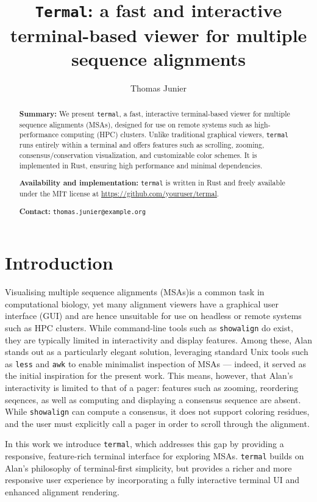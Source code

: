\documentclass[11pt]{article}
\title{%
\texttt{Termal}: a fast and interactive terminal-based viewer for multiple sequence alignments
}
\author[1]{Thomas Junier}
\affil[1]{Swiss Institute of Bioinformatics, Vital-\textsc{it} Group, Switzerland\\
\texttt{thomas.junier@sib.swiss}}
\date{} %
\begin{document}
\maketitle

\begin{abstract} \textbf{Summary:} We present \texttt{termal}, a fast,
  interactive terminal-based viewer for multiple sequence alignments (MSAs),
  designed for use on remote systems such as high-performance computing (HPC)
  clusters. Unlike traditional graphical viewers, \texttt{termal} runs entirely
  within a terminal and offers features such as scrolling, zooming,
  consensus/conservation visualization, and customizable color schemes. It is
  implemented in Rust, ensuring high performance and minimal dependencies.

  \textbf{Availability and implementation:} \texttt{termal} is written in Rust
  and freely available under the MIT license at
  \url{https://github.com/youruser/termal}.

\textbf{Contact:} \texttt{thomas.junier@example.org}
\end{abstract}

\section*{Introduction}

Visualising multiple sequence alignments (MSAs)is a common task in computational
biology, yet many alignment viewers have a graphical user interface (GUI) and
are hence unsuitable for use on headless or remote systems such as HPC clusters.
While command-line tools such as \texttt{showalign}\cite{emboss} do exist, they
are typically limited in interactivity and display features. Among these,
Alan\cite{alan} stands out as a particularly elegant solution, leveraging
standard Unix tools such as \texttt{less} and \texttt{awk} to enable minimalist
inspection of MSAs ---  indeed, it served as the initial inspiration for the
present work. This means, however, that Alan's interactivity is limited to that
of a pager: features such as zooming, reordering seqences, as well as computing
and displaying a consensus sequence are absent. While \texttt{showalign} can
compute a consensus, it does not support coloring residues, and the user must
explicitly call a pager in order to scroll through the alignment. 

In this work we introduce \texttt{termal}, which addresses this gap by providing
a responsive, feature-rich terminal interface for exploring MSAs.
\texttt{termal} builds on Alan’s philosophy of terminal-first simplicity, but
provides a richer and more responsive user experience by incorporating a fully
interactive terminal UI and enhanced alignment rendering.
\end{document}
